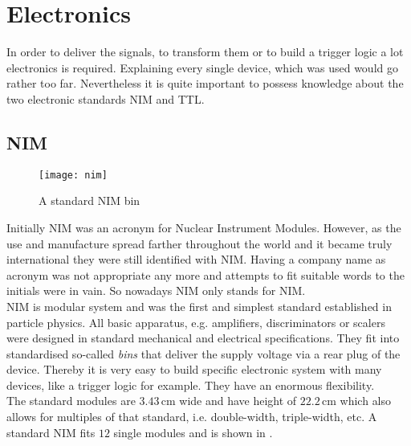 \section{Electronics}
In order to deliver the signals, to transform them or to build a trigger logic a lot electronics is required. Explaining every single device, which was used would go rather too far. Nevertheless it is quite important to possess knowledge about the two electronic standards NIM and \ac{TTL}.
\subsection{NIM}
\begin{figure}[ht]
	\centering
	\texttt{[image: nim]}
	\caption{A standard NIM bin}
	\label{pnim}
\end{figure}\no
Initially NIM was an acronym for Nuclear Instrument Modules. However, as the use and manufacture spread farther throughout the world and it became truly international they were still identified with NIM. Having a company name as acronym was not appropriate any more and attempts to fit suitable words to the initials were in vain. So nowadays NIM only stands for NIM.\\
NIM is modular system and was the first and simplest standard established in particle physics. All basic apparatus, e.g. amplifiers, discriminators or scalers were designed in standard mechanical and electrical specifications. They fit into standardised so-called \textit{bins} that deliver the supply voltage via a rear plug of the device. Thereby it is very easy to build specific electronic system with many devices, like a trigger logic for example. They have an enormous flexibility.\\
The standard modules are $3.43\,$cm wide and have height of $22.2\,$cm  which also allows for multiples of that standard, i.e. double-width, triple-width, etc. A standard NIM fits $12$ single modules and is shown in .
